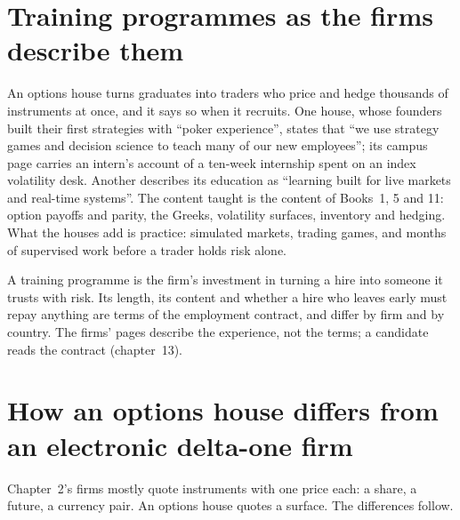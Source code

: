 \section{Training programmes as the firms describe them}

An options house turns graduates into traders who price and hedge thousands of instruments at once, and it says so
when it recruits. One house, whose founders built their first strategies with ``poker experience'', states that ``we use strategy games and decision science to
teach many of our new employees''; its campus page carries an intern's account of a ten-week internship spent on an
index volatility desk. Another describes its education as ``learning built for live markets and real-time systems''.
The content taught is the content of Books~1, 5 and 11: option payoffs and parity, the Greeks, volatility surfaces,
inventory and hedging. What the houses add is practice: simulated markets, trading games, and months of supervised
work before a trader holds risk alone.

\begin{remark}\label{rem:in:the-options-market-making-houses:programme}
A training programme is the firm's investment in turning a hire into someone it trusts with risk. Its length, its
content and whether a hire who leaves early must repay anything are terms of the employment contract, and differ by
firm and by country. The firms' pages describe the experience, not the terms; a candidate reads the contract
(chapter~13).
\end{remark}

\section{How an options house differs from an electronic delta-one firm}

Chapter~2's firms mostly quote instruments with one price each: a share, a future, a currency pair. An options house
quotes a surface. The differences follow.

